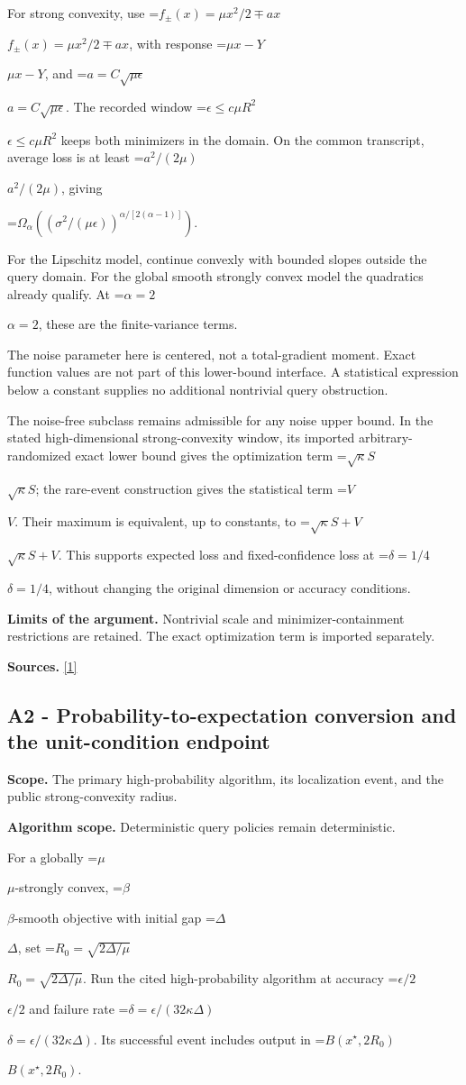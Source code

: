 \documentclass[10pt,a4paper]{article}
\newcommand{\AtlasMath}[1]{\par\begingroup\centering\setbox0=\hbox{$\displaystyle #1$}\ifdim\wd0>1.4\linewidth\typeout{ATLAS WIDE FORMULA: \the\wd0}\fi\ifdim\wd0>\linewidth\resizebox{\linewidth}{!}{\box0}\else\box0\fi\par\endgroup}
\newcommand{\AtlasInlineMath}[1]{\begingroup\setbox0=\hbox{$#1$}\ifdim\wd0>.4\linewidth\endgroup\AtlasMath{#1}\else\endgroup$#1$\fi}
\begin{document}
For strong convexity, use \AtlasInlineMath{f_\pm(x)=\mu x^2/2\mp ax}, with response \AtlasInlineMath{\mu x-Y}, and \AtlasInlineMath{a=C\sqrt{\mu\epsilon}}. The recorded window \AtlasInlineMath{\epsilon\le c\mu R^2} keeps both minimizers in the domain. On the common transcript, average loss is at least \AtlasInlineMath{a^2/(2\mu)}, giving

\AtlasMath{\Omega_\alpha((\sigma^2/(\mu\epsilon))^{\alpha/[2(\alpha-1)]}).}

For the Lipschitz model, continue convexly with bounded slopes outside the query domain. For the global smooth strongly convex model the quadratics already qualify. At \AtlasInlineMath{\alpha=2}, these are the finite-variance terms.

The noise parameter here is centered, not a total-gradient moment. Exact function values are not part of this lower-bound interface. A statistical expression below a constant supplies no additional nontrivial query obstruction.

The noise-free subclass remains admissible for any noise upper bound. In the stated high-dimensional strong-convexity window, its imported arbitrary-randomized exact lower bound gives the optimization term \AtlasInlineMath{\sqrt\kappa S}; the rare-event construction gives the statistical term \AtlasInlineMath{V}. Their maximum is equivalent, up to constants, to \AtlasInlineMath{\sqrt\kappa S+V}. This supports expected loss and fixed-confidence loss at \AtlasInlineMath{\delta=1/4}, without changing the original dimension or accuracy conditions.

\textbf{Limits of the argument.} Nontrivial scale and minimizer-containment restrictions are retained. The exact optimization term is imported separately.

\textbf{Sources.} \href{https://arxiv.org/pdf/2609.10874}{[1]}

\subsection{A2 - Probability-to-expectation conversion and the unit-condition endpoint}
\textbf{Scope.} The primary high-probability algorithm, its localization event, and the public strong-convexity radius.

\textbf{Algorithm scope.} Deterministic query policies remain deterministic.

For a globally \AtlasInlineMath{\mu}-strongly convex, \AtlasInlineMath{\beta}-smooth objective with initial gap \AtlasInlineMath{\Delta}, set \AtlasInlineMath{R_0=\sqrt{2\Delta/\mu}}. Run the cited high-probability algorithm at accuracy \AtlasInlineMath{\epsilon/2} and failure rate \AtlasInlineMath{\delta=\epsilon/(32\kappa\Delta)}. Its successful event includes output in \AtlasInlineMath{B(x^\star,2R_0)}.
\end{document}
